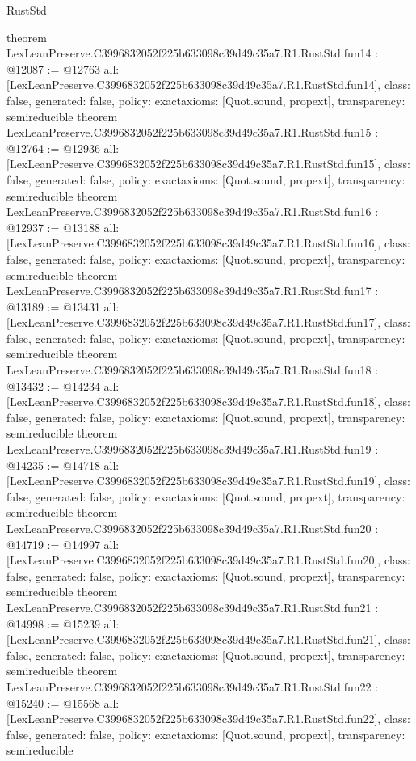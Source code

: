\begin{lexlean}{RustStd}
\begin{coremodule}
{}
theorem LexLeanPreserve.C3996832052f225b633098c39d49c35a7.R1.RustStd.fun14 : @12087 := @12763 {
  all: [LexLeanPreserve.C3996832052f225b633098c39d49c35a7.R1.RustStd.fun14],
  class: false,
  generated: false,
  policy: exact{axioms: [Quot.sound, propext]},
  transparency: semireducible
}
theorem LexLeanPreserve.C3996832052f225b633098c39d49c35a7.R1.RustStd.fun15 : @12764 := @12936 {
  all: [LexLeanPreserve.C3996832052f225b633098c39d49c35a7.R1.RustStd.fun15],
  class: false,
  generated: false,
  policy: exact{axioms: [Quot.sound, propext]},
  transparency: semireducible
}
theorem LexLeanPreserve.C3996832052f225b633098c39d49c35a7.R1.RustStd.fun16 : @12937 := @13188 {
  all: [LexLeanPreserve.C3996832052f225b633098c39d49c35a7.R1.RustStd.fun16],
  class: false,
  generated: false,
  policy: exact{axioms: [Quot.sound, propext]},
  transparency: semireducible
}
theorem LexLeanPreserve.C3996832052f225b633098c39d49c35a7.R1.RustStd.fun17 : @13189 := @13431 {
  all: [LexLeanPreserve.C3996832052f225b633098c39d49c35a7.R1.RustStd.fun17],
  class: false,
  generated: false,
  policy: exact{axioms: [Quot.sound, propext]},
  transparency: semireducible
}
theorem LexLeanPreserve.C3996832052f225b633098c39d49c35a7.R1.RustStd.fun18 : @13432 := @14234 {
  all: [LexLeanPreserve.C3996832052f225b633098c39d49c35a7.R1.RustStd.fun18],
  class: false,
  generated: false,
  policy: exact{axioms: [Quot.sound, propext]},
  transparency: semireducible
}
theorem LexLeanPreserve.C3996832052f225b633098c39d49c35a7.R1.RustStd.fun19 : @14235 := @14718 {
  all: [LexLeanPreserve.C3996832052f225b633098c39d49c35a7.R1.RustStd.fun19],
  class: false,
  generated: false,
  policy: exact{axioms: [Quot.sound, propext]},
  transparency: semireducible
}
theorem LexLeanPreserve.C3996832052f225b633098c39d49c35a7.R1.RustStd.fun20 : @14719 := @14997 {
  all: [LexLeanPreserve.C3996832052f225b633098c39d49c35a7.R1.RustStd.fun20],
  class: false,
  generated: false,
  policy: exact{axioms: [Quot.sound, propext]},
  transparency: semireducible
}
theorem LexLeanPreserve.C3996832052f225b633098c39d49c35a7.R1.RustStd.fun21 : @14998 := @15239 {
  all: [LexLeanPreserve.C3996832052f225b633098c39d49c35a7.R1.RustStd.fun21],
  class: false,
  generated: false,
  policy: exact{axioms: [Quot.sound, propext]},
  transparency: semireducible
}
theorem LexLeanPreserve.C3996832052f225b633098c39d49c35a7.R1.RustStd.fun22 : @15240 := @15568 {
  all: [LexLeanPreserve.C3996832052f225b633098c39d49c35a7.R1.RustStd.fun22],
  class: false,
  generated: false,
  policy: exact{axioms: [Quot.sound, propext]},
  transparency: semireducible
}
\end{coremodule}
\end{lexlean}
